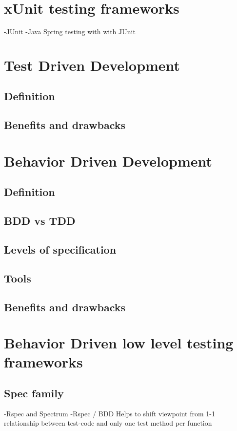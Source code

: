 \section{xUnit testing frameworks} %
-JUnit\newline
-Java Spring testing with with JUnit\newline
\section{Test Driven Development} %
    \subsection{Definition}
    \subsection{Benefits and drawbacks}
\section{Behavior Driven Development} %
    \subsection{Definition}
    \subsection{BDD vs TDD}
    \subsection{Levels of specification}
    \subsection{Tools}
    \subsection{Benefits and drawbacks}
\section{Behavior Driven low level testing frameworks} %
    \subsection{Spec family}
            -Rspec and Spectrum\newline
            -Rspec / BDD Helps to shift viewpoint from 1-1 relationship between test-code and only one test method per function
